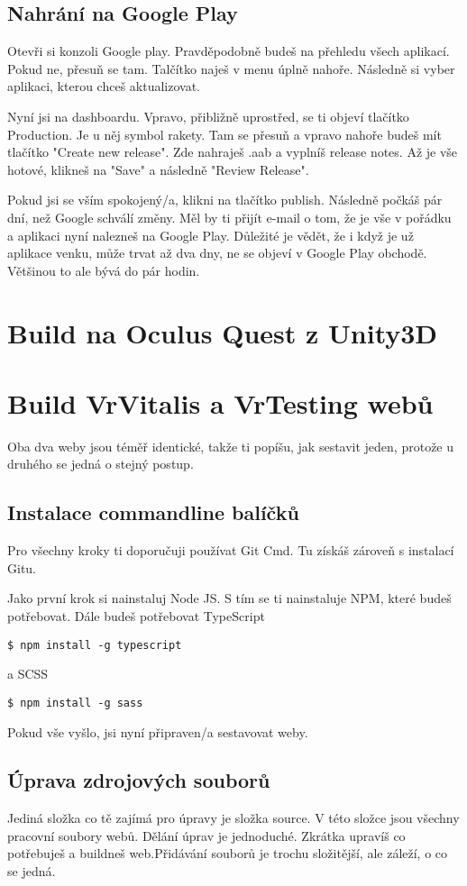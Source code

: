 \documentclass{article}
\begin{document}
\subsection{Nahrání na Google Play}
Otevři si konzoli Google play. Pravděpodobně budeš na přehledu všech aplikací. Pokud ne, přesuň se tam. Talčítko naješ v menu úplně nahoře. Následně si vyber aplikaci, kterou chceš aktualizovat.

Nyní jsi na dashboardu. Vpravo, přibližně uprostřed, se ti objeví tlačítko Production. Je u něj symbol rakety. Tam se přesuň a vpravo nahoře budeš mít tlačítko "Create new release". Zde nahraješ .aab a vyplníš release notes. Až je vše hotové, klikneš na "Save" a následně "Review Release". 

Pokud jsi se vším spokojený/a, klikni na tlačítko publish. Následně počkáš pár dní, než Google schválí změny. Měl by ti přijít e-mail o tom, že je vše v pořádku a aplikaci nyní nalezneš na Google Play. Důležité je vědět, že i když je už aplikace venku, může trvat až dva dny, ne se objeví v Google Play obchodě. Většinou to ale bývá do pár hodin.

\pagebreak

\section{Build na Oculus Quest z Unity3D}
\pagebreak

\section{Build VrVitalis a VrTesting webů}
Oba dva weby jsou téměř identické, takže ti popíšu, jak sestavit jeden, protože u druhého se jedná o stejný postup.
\subsection{Instalace commandline balíčků}
Pro všechny kroky ti doporučuji používat Git Cmd. Tu získáš zároveň s instalací Gitu.

Jako první krok si nainstaluj Node JS. S tím se ti nainstaluje NPM, které budeš potřebovat.
Dále budeš potřebovat TypeScript
\begin{lstlisting}
$ npm install -g typescript
\end{lstlisting}
a SCSS
\begin{lstlisting}
$ npm install -g sass
\end{lstlisting}
Pokud vše vyšlo, jsi nyní připraven/a sestavovat weby.
\subsection{Úprava zdrojových souborů}
Jediná složka co tě zajímá pro úpravy je složka source. V této složce jsou všechny pracovní soubory webů.
Dělání úprav je jednoduché. Zkrátka upravíš co potřebuješ a buildneš web.Přidávání souborů je trochu složitější, ale záleží, o co se jedná. 
\end{document}
